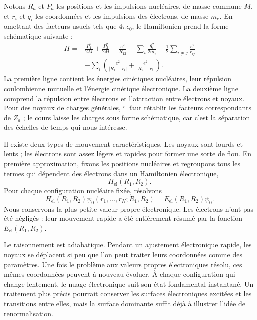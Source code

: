 Notons \(R_a\) et \(P_a\) les positions et les impulsions nucléaires, de masse commune \(M\), et \(r_i\) et \(q_i\) les coordonnées et les impulsions des électrons, de masse \(m_e\). En omettant des facteurs usuels tels que \(4\pi\epsilon_0\), le Hamiltonien prend la forme schématique suivante :
\begin{align}
H={}&
\frac{P_1^2}{2M}+\frac{P_2^2}{2M}
+\frac{e^2}{R_{12}}
+\sum_i\frac{q_i^2}{2m_e}
+\frac12\sum_{i\ne j}\frac{e^2}{r_{ij}}
\nonumber\\
&-\sum_i\left(
\frac{e^2}{|R_1-r_i|}
+\frac{e^2}{|R_2-r_i|}
\right).
\label{eq:molecular-hamiltonian}
\end{align}
La première ligne contient les énergies cinétiques nucléaires, leur répulsion coulombienne mutuelle et l’énergie cinétique électronique. La deuxième ligne comprend la répulsion entre électrons et l’attraction entre électrons et noyaux. Pour des noyaux de charges générales, il faut rétablir les facteurs correspondants de \(Z_a\) ; le cours laisse les charges sous forme schématique, car c’est la séparation des échelles de temps qui nous intéresse.

Il existe deux types de mouvement caractéristiques. Les noyaux sont lourds et lents ; les électrons sont assez légers et rapides pour former une sorte de flou. En première approximation, fixons les positions nucléaires et regroupons tous les termes qui dépendent des électrons dans un Hamiltonien électronique,
\begin{equation}
H_{\mathrm{el}}(R_1,R_2).
\end{equation}
Pour chaque configuration nucléaire fixée, résolvons
\begin{equation}
H_{\mathrm{el}}(R_1,R_2)
\psi_0(r_1,\ldots,r_N;R_1,R_2)
=
E_{\mathrm{el}}(R_1,R_2)\psi_0.
\label{eq:electronic-ground-state}
\end{equation}
Nous conservons la plus petite valeur propre électronique. Les électrons n’ont pas été négligés : leur mouvement rapide a été entièrement résumé par la fonction \(E_{\mathrm{el}}(R_1,R_2)\).

Le raisonnement est adiabatique. Pendant un ajustement électronique rapide, les noyaux se déplacent si peu que l’on peut traiter leurs coordonnées comme des paramètres. Une fois le problème aux valeurs propres électroniques résolu, ces mêmes coordonnées peuvent à nouveau évoluer. À chaque configuration qui change lentement, le nuage électronique suit son état fondamental instantané. Un traitement plus précis pourrait conserver les surfaces électroniques excitées et les transitions entre elles, mais la surface dominante suffit déjà à illustrer l’idée de renormalisation.

